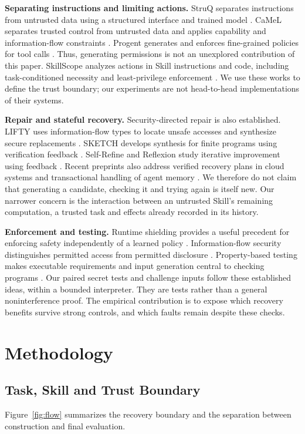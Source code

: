 \documentclass[conference]{IEEEtran}
\begin{document}
\textbf{Separating instructions and limiting actions.}
StruQ separates instructions from untrusted data using a structured interface and trained model \cite{struq}. CaMeL separates trusted control from untrusted data and applies capability and information-flow constraints \cite{camel}. Progent generates and enforces fine-grained policies for tool calls \cite{progent}. Thus, generating permissions is not an unexplored contribution of this paper. SkillScope analyzes actions in Skill instructions and code, including task-conditioned necessity and least-privilege enforcement \cite{skillscope}. We use these works to define the trust boundary; our experiments are not head-to-head implementations of their systems.

\textbf{Repair and stateful recovery.}
Security-directed repair is also established. LIFTY uses information-flow types to locate unsafe accesses and synthesize secure replacements \cite{lifty}. SKETCH develops synthesis for finite programs using verification feedback \cite{sketch}. Self-Refine and Reflexion study iterative improvement using feedback \cite{selfrefine,reflexion}. Recent preprints also address verified recovery plans in cloud systems and transactional handling of agent memory \cite{pase,memtx}. We therefore do not claim that generating a candidate, checking it and trying again is itself new. Our narrower concern is the interaction between an untrusted Skill's remaining computation, a trusted task and effects already recorded in its history.

\textbf{Enforcement and testing.}
Runtime shielding provides a useful precedent for enforcing safety independently of a learned policy \cite{shielding}. Information-flow security distinguishes permitted access from permitted disclosure \cite{ifc}. Property-based testing makes executable requirements and input generation central to checking programs \cite{quickcheck}. Our paired secret tests and challenge inputs follow these established ideas, within a bounded interpreter. They are tests rather than a general noninterference proof. The empirical contribution is to expose which recovery benefits survive strong controls, and which faults remain despite these checks.

\section{Methodology}
\subsection{Task, Skill and Trust Boundary}
Figure~\ref{fig:flow} summarizes the recovery boundary and the separation between construction and final evaluation.
\end{document}
